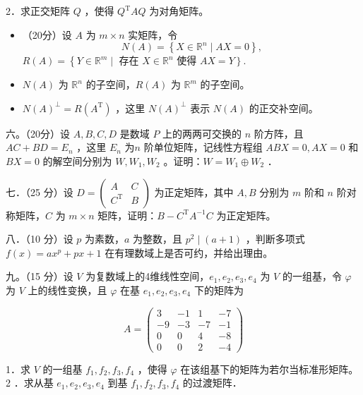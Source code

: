 \documentclass{article}
\begin{document}
2．求正交矩阵 \(Q\) ，使得 \(Q^{\mathrm{T}} A Q\) 为对角矩阵。

\begin{itemize}
  \item[五．] （20分）设 \(A\) 为 \(m \times n\) 实矩阵，令
\[
N(A)=\left\{X \in \mathbb{R}^{n} \mid A X=0\right\},
\]
\(R(A)=\left\{Y \in \mathbb{R}^{m} \mid\right.\) 存在 \(X \in \mathbb{R}^{n}\) 使得 \(\left.A X=Y\right\}\).

  \item[1．] \(N(A)\) 为 \(\mathbb{R}^{n}\) 的子空间，\(R(A)\) 为 \(\mathbb{R}^{m}\) 的子空间。

  \item[2．] \(N(A)^{\perp}=R\left(A^{\mathrm{T}}\right)\) ，这里 \(N(A)^{\perp}\) 表示 \(N(A)\) 的正交补空间。
\end{itemize}

六。（20分）设 \(A, B, C, D\) 是数域 \(P\) 上的两两可交换的 \(n\) 阶方阵，且 \(A C+B D=E_{n}\) ，这里 \(E_{n}\) 为\(n\) 阶单位矩阵，记线性方程组 \(A B X=0, A X=0\) 和 \(B X=0\) 的解空间分别为 \(W, W_{1}, W_{2}\) 。证明：\(W=W_{1} \oplus W_{2}\) ．

七．（25 分）设 \(D=\left(\begin{array}{cc}A & C \\ C^{\mathrm{T}} & B\end{array}\right)\) 为正定矩阵，其中 \(A, B\) 分别为 \(m\) 阶和 \(n\) 阶对称矩阵，\(C\) 为 \(m \times n\) 矩阵，证明：\(B-C^{\mathrm{T}} A^{-1} C\) 为正定矩阵。

八．（10 分）设 \(p\) 为素数，\(a\) 为整数，且 \(p^{2} \mid(a+1)\) ，判断多项式 \(f(x)=a x^{p}+p x+1\) 在有理数域上是否可约，并给出理由。

九。（15 分）设 \(V\) 为复数域上的4维线性空间，\(e_{1}, e_{2}, e_{3}, e_{4}\) 为 \(V\) 的一组基，令 \(\varphi\) 为 \(V\) 上的线性变换，且 \(\varphi\) 在基 \(e_{1}, e_{2}, e_{3}, e_{4}\) 下的矩阵为

\[
A=\left(\begin{array}{cccc}
3 & -1 & 1 & -7 \\
-9 & -3 & -7 & -1 \\
0 & 0 & 4 & -8 \\
0 & 0 & 2 & -4
\end{array}\right)
\]

1．求 \(V\) 的一组基 \(f_{1}, f_{2}, f_{3}, f_{4}\) ，使得 \(\varphi\) 在该组基下的矩阵为若尔当标准形矩阵。\\

2 ．求从基 \(e_{1}, e_{2}, e_{3}, e_{4}\) 到基 \(f_{1}, f_{2}, f_{3}, f_{4}\) 的过渡矩阵．
\end{document}
